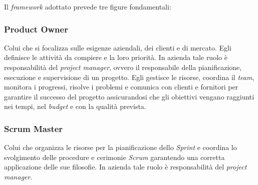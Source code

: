 \noindent Il \emph{framework} adottato prevede tre figure fondamentali: 
\subsubsection*{Product Owner}
Colui che si focalizza sulle esigenze aziendali, dei clienti e di mercato. Egli definisce le attività da compiere e la loro priorità.
In azienda tale ruolo è responsabilità del \emph{project manager}, ovvero il responsabile della pianificazione, esecuzione e supervisione di un progetto. Egli gestisce le risorse, coordina il \emph{team}, monitora i progressi, risolve i problemi e comunica con clienti e fornitori per garantire il successo del progetto assicurandosi che gli obiettivi vengano raggiunti nei tempi, nel \emph{budget} e con la qualità prevista.  

\subsubsection*{Scrum Master}
Colui che organizza le risorse per la pianificazione dello \emph{Sprint} e coordina lo svolgimento delle procedure e cerimonie \emph{Scrum} garantendo una corretta applicazione delle sue filosofie.
In azienda tale ruolo è responsabilità del \emph{project manager}. 

